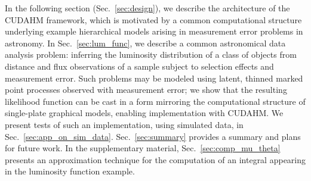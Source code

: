 
In the following section (Sec.~\ref{sec:design}), we describe the architecture of the CUDAHM framework, which is motivated by a common computational structure underlying example hierarchical models arising in measurement error problems in astronomy. 
In Sec.~\ref{sec:lum_func}, we describe a common astronomical data analysis problem: inferring the luminosity distribution of a class of objects from distance and flux observations of a sample subject to selection effects and measurement error.
Such problems may be modeled using latent, thinned marked point processes observed with measurement error; we show that the resulting likelihood function can be cast in a form mirroring the computational structure of single-plate graphical models, enabling implementation with CUDAHM.
We present tests of such an implementation, using simulated data, in Sec.~\ref{sec:app_on_sim_data}.
Sec.~\ref{sec:summary} provides a summary and plans for future work.
In the supplementary material, Sec.~\ref{sec:comp_mu_theta} presents an approximation technique for the computation of an integral appearing in the luminosity function example.

